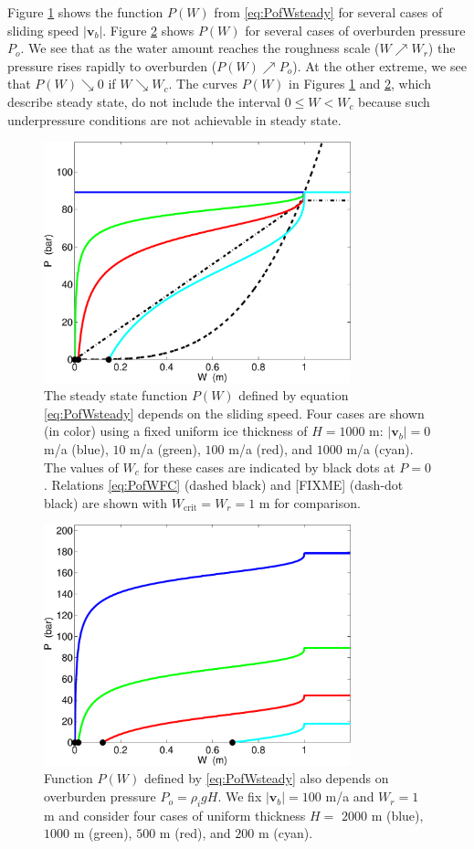 \documentclass[11pt,final]{amsart}
\newcommand\bv{\mathbf{v}}
\begin{document}
\newcommand{\upto}{ \!\!\nearrow\! }
\newcommand{\downto}{ \!\searrow\! }
Figure \ref{fig:psteady-vb} shows the function $P(W)$ from \eqref{eq:PofWsteady} for several cases of sliding speed $|\bv_b|$.  Figure \ref{fig:psteady-Po} shows $P(W)$ for several cases of overburden pressure $P_o$.  We see that as the water amount reaches the roughness scale ($W\upto W_r$) the pressure rises rapidly to overburden ($P(W) \upto P_o$).  At the other extreme, we see that $P(W) \downto 0$ if $W \downto W_c$.  The curves $P(W)$ in Figures \ref{fig:psteady-vb} and \ref{fig:psteady-Po}, which describe steady state, do not include the interval $0\le W < W_c$ because such underpressure conditions are not achievable in steady state.

\begin{figure}[ht]
\includegraphics[width=3.5in,keepaspectratio=true]{psteady-vb}
\medskip
\caption{The steady state function $P(W)$ defined by equation \eqref{eq:PofWsteady} depends on the sliding speed.  Four cases are shown (in color) using a fixed uniform ice thickness of $H=1000$ m: $|\bv_b|=0$ m/a (blue), $10$ m/a (green), $100$ m/a (red), and $1000$ m/a (cyan).  The values of $W_c$ for these cases are indicated by black dots at $P=0$.  Relations \eqref{eq:PofWFC} (dashed black) and [FIXME] (dash-dot black) are shown with $W_{\text{crit}}=W_r=1$ m for comparison.}
\label{fig:psteady-vb}
\end{figure}

\begin{figure}[ht]
\includegraphics[width=3.5in,keepaspectratio=true]{psteady-Po}
\medskip
\caption{Function $P(W)$ defined by \eqref{eq:PofWsteady} also depends on overburden pressure $P_o=\rho_i g H$.  We fix $|\bv_b|=100$ m/a and $W_r=1$ m and consider four cases of uniform thickness $H=$ $2000$ m (blue), $1000$ m (green), $500$ m (red), and $200$ m (cyan).}
\label{fig:psteady-Po}
\end{figure}
\end{document}
